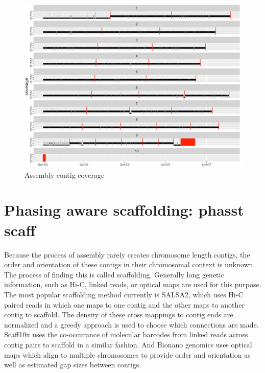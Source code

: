 \begin{figure}[htbp!]
\caption{Assembly contig coverage}
\label{figure:contigcoverage}
\begin{centering}
\includegraphics[width=\textwidth]{assemblycontigcoverage.png}
\end{centering}

\end{figure}

\clearpage

\section{Phasing aware scaffolding: phasst scaff}

\par{
Because the process of assembly rarely creates chromosome length contigs, the order and orientation of these contigs in their chromosomal context is unknown. The process of finding this is called scaffolding. Generally long genetic information, such as Hi-C, linked reads, or optical maps are used for this purpose. The most popular scaffolding method currently is SALSA2, which uses Hi-C paired reads in which one maps to one contig and the other maps to another contig to scaffold. The density of these cross mappings to contig ends are normalized and a greedy approach is used to choose which connections are made\cite{SALSA}. Scaff10x uses the co-occurance of molecular barcodes from linked reads across contig pairs to scaffold in a similar fashion\cite{scaff10x}. And Bionano genomics uses optical maps which align to multiple chromosomes to provide order and orientation as well as estimated gap sizes between contigs\cite{bionano_assembly}.
}

